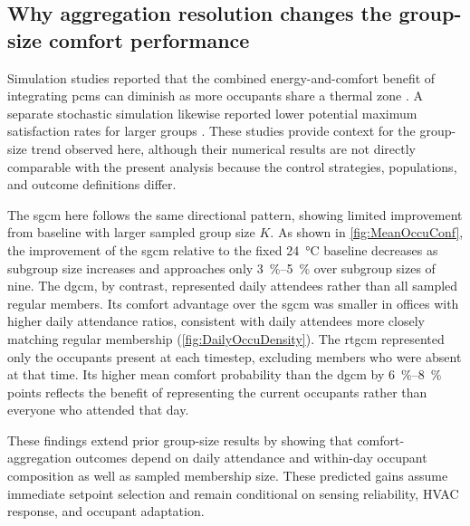 
\subsection{Why aggregation resolution changes the group-size comfort performance}
Simulation studies reported that the combined energy-and-comfort benefit of integrating \acp{pcm} can diminish as more occupants share a thermal zone \cite{jung_energy_2020}.
A separate stochastic simulation likewise reported lower potential maximum satisfaction rates for larger groups \cite{wang_enhancing_2026}.
These studies provide context for the group-size trend observed here, although their numerical results are not directly comparable with the present analysis because the control strategies, populations, and outcome definitions differ.

The \ac{sgcm} here follows the same directional pattern, showing limited improvement from baseline with larger sampled group size $K$.
As shown in \autoref{fig:MeanOccuConf}, the improvement of the \ac{sgcm} relative to the fixed \qty{24}{\celsius} baseline decreases as subgroup size increases and approaches only \qtyrange{3}{5}{\percent} over subgroup sizes of nine.
The \ac{dgcm}, by contrast, represented daily attendees rather than all sampled regular members.
Its comfort advantage over the \ac{sgcm} was smaller in offices with higher daily attendance ratios, consistent with daily attendees more closely matching regular membership (\autoref{fig:DailyOccuDensity}).
The \ac{rtgcm} represented only the occupants present at each timestep, excluding members who were absent at that time.
Its higher mean comfort probability than the \ac{dgcm} by \qtyrange{6}{8}{\percent} points reflects the benefit of representing the current occupants rather than everyone who attended that day.

These findings extend prior group-size results by showing that comfort-aggregation outcomes depend on daily attendance and within-day occupant composition as well as sampled membership size.
These predicted gains assume immediate setpoint selection and remain conditional on sensing reliability, HVAC response, and occupant adaptation.

